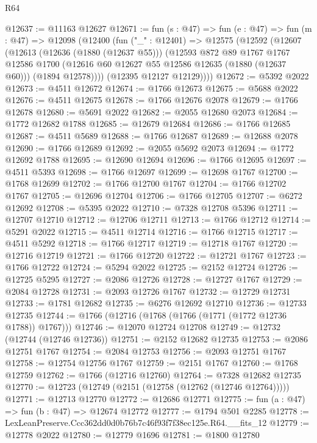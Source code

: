 \begin{lexlean}{R64}
\begin{coremodule}
@12637 := @11163 @12627
@12671 := fun (s : @47) =>
  fun (e : @47) =>
  fun (m : @47) =>
  @12098
    (@12400
      (fun ("_" : @12401) =>
      @12575
        (@12592
          (@12607
            (@12613
              (@12636 (@1880 (@12637 @55)))
              (@12593
                @872
                @89
                @1767
                @1767
                @12586
                @1700
                (@12616 @60 @12627 @55 @12586 @12635 (@1880 (@12637 @60)))
                (@1894 @12578))))
          (@12395 @12127 @12129))))
@12672 := @5392 @2022
@12673 := @4511 @12672
@12674 := @1766 @12673
@12675 := @5688 @2022
@12676 := @4511 @12675
@12678 := @1766 @12676 @2078
@12679 := @1766 @12678
@12680 := @5691 @2022
@12682 := @2055 @12680 @2073
@12684 := @1772 @12682 @1788
@12685 := @12679 @12684
@12686 := @1766 @12685
@12687 := @4511 @5689
@12688 := @1766 @12687
@12689 := @12688 @2078
@12690 := @1766 @12689
@12692 := @2055 @5692 @2073
@12694 := @1772 @12692 @1788
@12695 := @12690 @12694
@12696 := @1766 @12695
@12697 := @4511 @5393
@12698 := @1766 @12697
@12699 := @12698 @1767
@12700 := @1768 @12699
@12702 := @1766 @12700 @1767
@12704 := @1766 @12702 @1767
@12705 := @12696 @12704
@12706 := @1766 @12705
@12707 := @6272 @12692
@12708 := @5395 @2022
@12710 := @7328 @12708 @5396
@12711 := @12707 @12710
@12712 := @12706 @12711
@12713 := @1766 @12712
@12714 := @5291 @2022
@12715 := @4511 @12714
@12716 := @1766 @12715
@12717 := @4511 @5292
@12718 := @1766 @12717
@12719 := @12718 @1767
@12720 := @12716 @12719
@12721 := @1766 @12720
@12722 := @12721 @1767
@12723 := @1766 @12722
@12724 := @5294 @2022
@12725 := @2152 @12724
@12726 := @12725 @5295
@12727 := @2086 @12726
@12728 := @12727 @1767
@12729 := @2084 @12728
@12731 := @2093 @12726 @1767
@12732 := @12729 @12731
@12733 := @1781 @12682
@12735 := @6276 @12692 @12710
@12736 := @12733 @12735
@12744 := @1766 (@12716 (@1768 (@1766 (@1771 (@1772 @12736 @1788)) @1767)))
@12746 := @12070 @12724 @12708
@12749 := @12732 (@12744 (@12746 @12736))
@12751 := @2152 @12682 @12735
@12753 := @2086 @12751 @1767
@12754 := @2084 @12753
@12756 := @2093 @12751 @1767
@12758 := @12754 @12756 @1767
@12759 := @2151 @1767
@12760 := @1768 @12759
@12762 := @1766 (@12716 @12760)
@12764 := @7328 @12682 @12735
@12770 := @12723 (@12749 (@2151 (@12758 (@12762 (@12746 @12764)))))
@12771 := @12713 @12770
@12772 := @12686 @12771
@12775 := fun (a : @47) => fun (b : @47) => @12674 @12772
@12777 := @1794 @501 @2285
@12778 := LexLeanPreserve.Ccc362dd0d0b76b7c46f93f7f38ec125e.R64.__fits_12
@12779 := @12778 @2022
@12780 := @12779 @1696
@12781 := @1800 @12780

\end{coremodule}
\end{lexlean}
